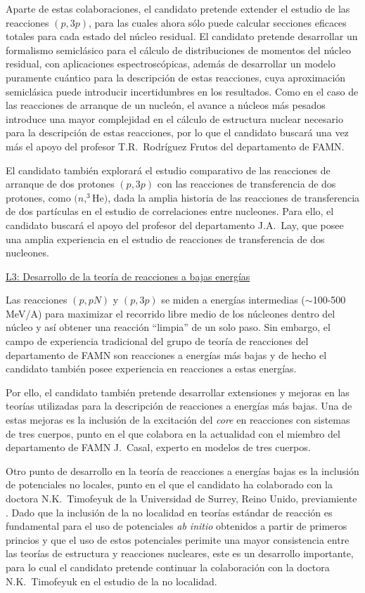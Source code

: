 \documentclass[a4paper,12pt,twoside]{article}
\begin{document}
Aparte de estas colaboraciones, el candidato pretende extender el estudio de las reacciones $(p,3p)$, para las cuales ahora sólo puede calcular secciones eficaces totales para cada estado del núcleo residual. El candidato pretende desarrollar un formalismo semiclásico para el cálculo de distribuciones de momentos del núcleo residual, con aplicaciones espectroscópicas, además de desarrollar un modelo puramente cuántico para la descripción de estas reacciones, cuya aproximación semiclásica puede introducir incertidumbres en los resultados. Como en el caso de las reacciones de arranque de un nucleón, el avance a núcleos más pesados introduce una mayor complejidad en el cálculo de estructura nuclear necesario para la descripción de estas reacciones, por lo que el candidato buscará una vez más el apoyo del profesor T.R.~Rodríguez Frutos del departamento de FAMN.

El candidato también explorará el estudio comparativo de las reacciones de arranque de dos protones $(p,3p)$ con las reacciones de transferencia de dos protones, como $(n,^3$He$)$, dada la amplia historia de las reacciones de transferencia de dos partículas en el estudio de correlaciones entre nucleones. Para ello, el candidato buscará el apoyo del profesor del departamento J.A.~Lay, que posee una amplia experiencia en el estudio de reacciones de transferencia de dos nucleones.

\underline{L3: Desarrollo de la teoría de reacciones a bajas energías}

Las reacciones $(p,pN)$ y $(p,3p)$ se miden a energías intermedias ($\sim$100-500 MeV/A) para maximizar el recorrido libre medio de los núcleones dentro del núcleo y así obtener una reacción ``limpia'' de un solo paso. Sin embargo, el campo de experiencia tradicional del grupo de teoría de reacciones del departamento de FAMN  son reacciones a energías más bajas y de hecho el candidato también posee experiencia en reacciones a estas energías.

Por ello, el candidato también pretende desarrollar extensiones y mejoras en las teorías utilizadas para la descripción de reacciones a energías más bajas. Una de estas mejoras es la inclusión de la excitación del \textit{core} en reacciones con sistemas de tres cuerpos, punto en el que colabora en la actualidad con el miembro del departamento de FAMN J.~Casal, experto en modelos de tres cuerpos.

Otro punto de desarrollo en la teoría de reacciones a energías bajas es la inclusión de potenciales no locales, punto en el que el candidato ha colaborado con la doctora N.K.~Timofeyuk de la Universidad de Surrey, Reino Unido, previamiente \cite{Tim18,Tim19,Fro23}. Dado que la inclusión de la no localidad en teorías estándar de reacción es fundamental para el uso de potenciales \textit{ab initio} obtenidos a partir de primeros princios y que  el uso de estos potenciales perimite una mayor consistencia entre las teorías de estructura y reacciones nucleares, este es un desarrollo importante, para lo cual el candidato pretende continuar la colaboración con la doctora N.K.~Timofeyuk en el estudio de la no localidad.
\end{document}
